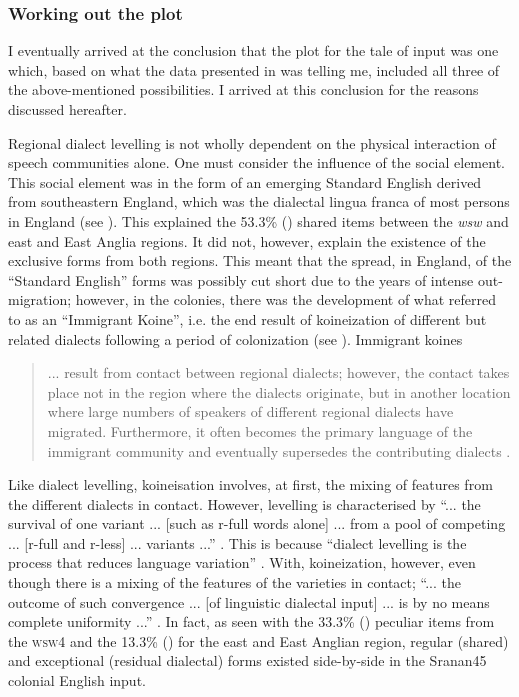 \subsubsection{Working out the plot}\label{7.2.1.1}
I eventually arrived at the conclusion that the plot for the tale of input was one which, based on what the data presented in  was telling me, included all three of the above-mentioned possibilities. I arrived at this conclusion for the reasons discussed hereafter.

Regional dialect levelling is not wholly dependent on the physical interaction of speech communities alone. One must consider the influence of the social element. This social element was in the form of an emerging Standard English derived from southeastern England, which was the dialectal lingua franca of most persons in England (see \citealt{Smith87, Smith08}). This explained the 53.3\% () shared items between the \emph{wsw} and east and East Anglia regions. It did not, however, explain the existence of the exclusive forms from both regions. This meant that the spread, in England, of the ``Standard English'' forms was possibly cut short due to the years of intense out-migration; however, in the colonies, there was the development of what \citet{Siegel85} referred to as an ``Immigrant Koine'', i.e. the end result of koineization of different but related dialects following a period of colonization (see \citealt{Siegel04}). Immigrant koines

\begin{quote}
... result from contact between regional dialects; however, the contact takes place not in the region where the dialects originate, but in another location where large numbers of speakers of different regional dialects have migrated. Furthermore, it often becomes the primary language of the immigrant community and eventually supersedes the contributing dialects \citep{Siegel85}.
\end{quote}

Like dialect levelling, koineisation involves, at first, the mixing of features from the different dialects in contact. However, levelling is characterised by ``... the survival of one variant ... [such as r-full words alone] ... from a pool of competing ... [r-full and r-less] ... variants ...'' \citep[91]{Tuten03}. This is because ``dialect levelling is the process that reduces language variation'' \citep[313]{Hinskens09}. With, koineization, however, even though there is a mixing of the features of the varieties in contact; ``... the outcome of such convergence ... [of linguistic dialectal input] ... is by no means complete uniformity ...'' \citep[193]{Bynon83}. In fact, as seen with the 33.3\% () peculiar items from the \textsc{wsw4} and the 13.3\% () for the east and East Anglian region, regular (shared) and exceptional (residual dialectal) forms existed side-by-side in the Sranan45 colonial English input.

